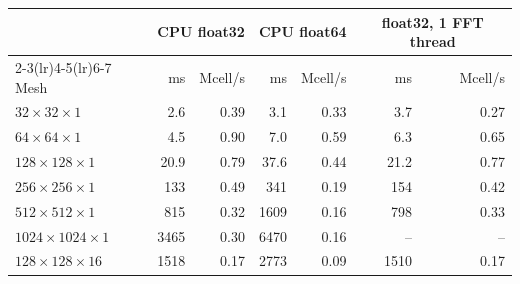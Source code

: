 \begin{tabular}{l rr rr rr}
\toprule
 & \multicolumn{2}{c}{CPU float32} & \multicolumn{2}{c}{CPU float64} & \multicolumn{2}{c}{float32, 1 FFT thread}\\
\cmidrule(lr){2-3}\cmidrule(lr){4-5}\cmidrule(lr){6-7}
Mesh & ms & Mcell/s & ms & Mcell/s & ms & Mcell/s\\
\midrule
$32\times32\times1$ & 2.6 & 0.39 & 3.1 & 0.33 & 3.7 & 0.27\\
$64\times64\times1$ & 4.5 & 0.90 & 7.0 & 0.59 & 6.3 & 0.65\\
$128\times128\times1$ & 20.9 & 0.79 & 37.6 & 0.44 & 21.2 & 0.77\\
$256\times256\times1$ & 133 & 0.49 & 341 & 0.19 & 154 & 0.42\\
$512\times512\times1$ & 815 & 0.32 & 1609 & 0.16 & 798 & 0.33\\
$1024\times1024\times1$ & 3465 & 0.30 & 6470 & 0.16 & -- & --\\
$128\times128\times16$ & 1518 & 0.17 & 2773 & 0.09 & 1510 & 0.17\\
\bottomrule
\end{tabular}
